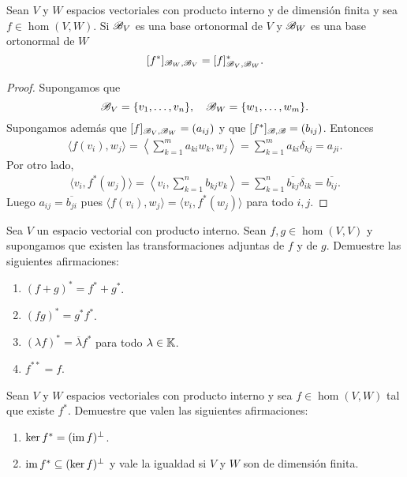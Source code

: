 \begin{prop}
	Sean $V$ y $W$ espacios vectoriales con producto interno y de dimensión
	finita y sea $f\in\hom(V,W)$. Si $\mathscr{B}_V$ es una base ortonormal de $V$ y
	$\mathscr{B}_W$ es una base ortonormal de $W$
	\[
		[f^*]_{\mathscr{B}_W,\mathscr{B}_V}=[f]_{\mathscr{B}_V,\mathscr{B}_W}^*.
	\]

	\begin{proof}
		Supongamos que 
		\[
		\mathscr{B}_V=\{v_1,\dots,v_n\},
		\quad
		\mathscr{B}_W=\{w_1,\dots,w_m\}.
		\]
		Supongamos además que 
		$[f]_{\mathscr{B}_V,\mathscr{B}_W}=(a_{ij})$ y que 
		$[f^*]_{\mathscr{B},\mathscr{B}}=(b_{ij})$. Entonces
		\begin{align*}
			\langle f(v_i),w_j\rangle
			=\left\langle \sum_{k=1}^m a_{ki}w_k,w_j\right\rangle
			=\sum_{k=1}^ma_{ki}\delta_{kj}
			=a_{ji}.
		\end{align*}
		Por otro lado, 
		\begin{align*}
			\langle v_i,f^*(w_j)\rangle
			=\left\langle v_i,\sum_{k=1}^n b_{kj}v_k\right\rangle
			=\sum_{k=1}^n\overline{b_{kj}}\delta_{ik}=\overline{b_{ij}}.
		\end{align*}
		Luego $a_{ij}=\overline{b_{ji}}$ pues $\langle
		f(v_i),w_j\rangle=\langle v_i,f^*(w_j)\rangle$ para todo $i,j$.
	\end{proof}
\end{prop}

\begin{xca}
	Sea $V$ un espacio vectorial con producto interno. Sean $f,g\in\hom(V,V)$
	y supongamos que existen las transformaciones adjuntas de $f$ y de $g$.
	Demuestre las siguientes afirmaciones:
	\begin{enumerate}
		\item $(f+g)^*=f^*+g^*$.
		\item $(fg)^*=g^*f^*$.
		\item $(\lambda f)^*=\overline{\lambda}f^*$ para todo $\lambda\in\mathbb{K}$. 
		\item $f^{**}=f$. 
	\end{enumerate}
\end{xca}

\begin{xca}
	Sean $V$ y $W$ espacios vectoriales con producto interno y sea
	$f\in\hom(V,W)$ tal que existe $f^*$. Demuestre que valen las siguientes
	afirmaciones:
	\begin{enumerate}
		\item $\ker f^*=(\operatorname{im} f)^\perp$.
		\item $\operatorname{im} f^*\subseteq(\ker f)^\perp$ y vale la igualdad si $V$ y $W$ son de 
			dimensión finita.
	\end{enumerate}
\end{xca}

